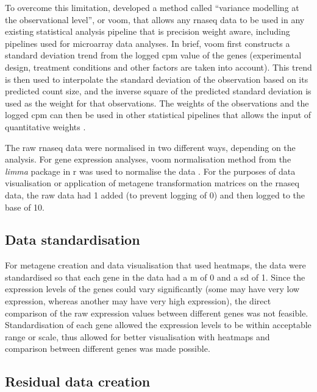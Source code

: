 To overcome this limitation, \citet{Law2014} developed a method called ``variance modelling at the observational level'', or voom, that allows any \gls{rnaseq} data to be used in any existing statistical analysis pipeline that is precision weight aware, including pipelines used for microarray data analyses.
In brief, voom first constructs a standard deviation trend from the logged \gls{cpm} value of the genes (experimental design, treatment conditions and other factors are taken into account).
This trend is then used to interpolate the standard deviation of the observation based on its predicted count size, and the inverse square of the predicted standard deviation is used as the weight  for that observations.
The weights of the observations and the logged \gls{cpm} can then be used in other statistical pipelines that allows the input of quantitative weights \citep{Law2014}.

The raw \gls{rnaseq} data were normalised in two different ways, depending on the analysis.
For gene expression analyses, voom normalisation method from the \textit{limma} package in \gls{r} was used to normalise the data \citep{Ritchie2015}.
For the purposes of data visualisation or application of metagene transformation matrices on the \gls{rnaseq} data, the raw data had 1 added (to prevent logging of 0) and then logged to the base of 10.

\subsection{Data standardisation}
\label{sub:data_standardisation}

For metagene creation and data visualisation that used heatmaps, the data were standardised so that each gene in the data had a \gls{m} of 0 and a \gls{sd} of 1.
Since the expression levels of the genes could vary significantly (some may have very low expression, whereas another may have very high expression), the direct comparison of the raw expression values between different genes was not feasible.
Standardisation of each gene allowed the expression levels to be within acceptable range or scale, thus allowed for better visualisation with heatmaps and comparison between different genes was made possible.

\subsection{Residual data creation}
\label{sub:residual_data_creation}

